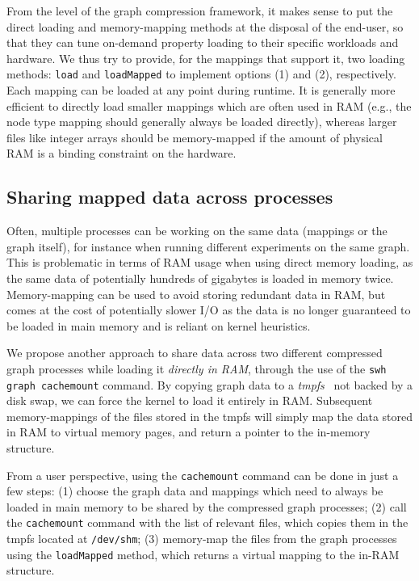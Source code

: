 From the level of the graph compression framework, it makes sense to put the
direct loading and memory-mapping methods at the disposal of the end-user, so
that they can tune on-demand property loading to their specific workloads and
hardware. We thus try to provide, for the mappings that support it, two loading
methods: \texttt{load} and \texttt{loadMapped} to implement options (1) and
(2), respectively.
Each mapping can be loaded at any point during runtime. It is generally more
efficient to directly load smaller mappings which are often used in RAM (e.g.,
the node type mapping should generally always be loaded directly), whereas
larger files like integer arrays should be memory-mapped if the amount of
physical RAM is a binding constraint on the hardware.

\subsection{Sharing mapped data across processes}%
\label{sec:cachemount}

Often, multiple processes can be working on the same data (mappings or the
graph itself), for instance when running different experiments on the same
graph. This is problematic in terms of RAM usage when using direct memory
loading, as the same data of potentially hundreds of gigabytes is loaded in
memory twice. Memory-mapping can be used to avoid storing redundant data in
RAM, but comes at the cost of potentially slower I/O as the data is no longer
guaranteed to be loaded in main memory and is reliant on kernel heuristics.

We propose another approach to share data across two different compressed graph
processes while loading it \emph{directly in RAM}, through the use of the
\texttt{swh graph cachemount} command. By copying graph data to a
\emph{tmpfs}~\cite{snyder1990tmpfs} not backed by a disk swap, we can force the
kernel to load it entirely in RAM\@. Subsequent memory-mappings of the files
stored in the tmpfs will simply map the data stored in RAM to virtual memory
pages, and return a pointer to the in-memory structure.

From a user perspective, using the \texttt{cachemount} command can be done in
just a few steps: (1) choose the graph data and mappings which need to always
be loaded in main memory to be shared by the compressed graph processes; (2)
call the \texttt{cachemount} command with the list of relevant files, which
copies them in the tmpfs located at \texttt{/dev/shm}; (3) memory-map the files
from the graph processes using the \texttt{loadMapped} method, which returns a
virtual mapping to the in-RAM structure.

